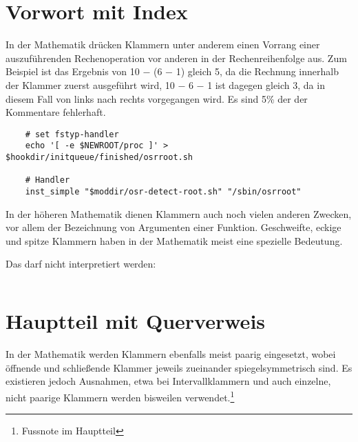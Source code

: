 \documentclass[10pt,a4paper]{article}
\begin{document}


\maketitle

\newpage

\tableofcontents

\newpage

\section {Vorwort mit Index}

In der Mathematik drücken Klammern unter anderem einen Vorrang einer
auszuführenden Rechenoperation vor anderen in der Rechenreihenfolge aus. Zum
Beispiel ist das Ergebnis von 10 − (6 − 1) gleich 5, da
die Rechnung innerhalb %
der Klammer zuerst ausgeführt wird, 10 − 6 − 1 ist dagegen gleich 3, da in
diesem Fall von links nach rechts vorgegangen wird.
Es sind 5\% der der Kommentare fehlerhaft.

\begin{lstlisting}
    # set fstyp-handler
    echo '[ -e $NEWROOT/proc ]' > $hookdir/initqueue/finished/osrroot.sh

    # Handler
    inst_simple "$moddir/osr-detect-root.sh" "/sbin/osrroot"
\end{lstlisting}


In der höheren Mathematik
dienen Klammern auch noch vielen anderen Zwecken, vor allem der Bezeichnung
von Argumenten einer Funktion. Geschweifte, eckige und spitze Klammern haben
in der Mathematik meist eine spezielle Bedeutung.

Das darf nicht interpretiert werden:
\begin{verbatim}

\end{verbatim} 



%

\section[Hauptteil]{Hauptteil mit Querverweis}

In der Mathematik werden Klammern ebenfalls meist paarig eingesetzt, wobei
öffnende und schließende Klammer jeweils zueinander spiegelsymmetrisch sind.
Es existieren jedoch Ausnahmen, etwa bei Intervallklammern und auch einzelne,
nicht paarige Klammern werden bisweilen verwendet.\footnote{Fussnote im Hauptteil}
\end{document}
